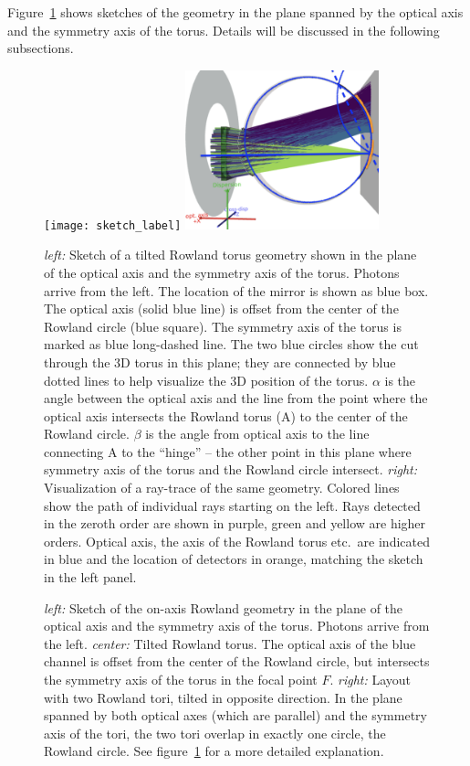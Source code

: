 \documentclass[linenumbers]{aastex631}
\begin{document}
Figure~\ref{fig:sketch_label} shows sketches of the geometry in the plane spanned by the optical axis and the symmetry axis of the torus. Details will be discussed in the following subsections.
\begin{figure}
    \texttt{[image: sketch\_label]}
    \includegraphics[width=0.5\textwidth]{raytrace_labelled}
    \caption{\emph{left:} Sketch of a tilted Rowland torus geometry shown in the plane of the optical axis and the symmetry axis of the torus. Photons arrive from the left. The location of the mirror is shown as blue box. The optical axis (solid blue line) is offset from the center of the Rowland circle (blue square). The symmetry axis of the torus  is marked as blue long-dashed line. The two blue circles show the cut through the 3D torus in this plane; they are connected by blue dotted lines to help visualize the 3D position of the torus. $\alpha$ is the angle between the optical axis and the line from the point where the optical axis intersects the Rowland torus (A) to the center of the Rowland circle. $\beta$ is the angle from optical axis to the line connecting A to the ``hinge'' -- the other point in this plane where symmetry axis of the torus and the Rowland circle intersect.
    \emph{right:} Visualization of a ray-trace of the same geometry. Colored lines show the path of individual rays starting on the left. Rays detected in the zeroth order are shown in purple, green and yellow are higher orders. Optical axis, the axis of the Rowland torus etc.\ are indicated in blue and the location of detectors in orange, matching the sketch in the left panel.
        }
    \label{fig:sketch_label}
\end{figure}
\begin{figure}
    \caption{\emph{left:} Sketch of the on-axis Rowland geometry in the plane of the optical axis and the symmetry axis of the torus. Photons arrive from the left.
    \emph{center:} Tilted Rowland torus. The optical axis of the blue channel is offset from the center of the Rowland circle, but intersects the symmetry axis of the torus in the focal point $F$.
    \emph{right:} Layout with two Rowland tori, tilted in opposite direction. In the plane spanned by both optical axes (which are parallel) and the symmetry axis of the tori, the two tori overlap in exactly one circle, the Rowland circle. See figure~\ref{fig:sketch_label} for a more detailed explanation.
        }
    \label{fig:sketch}
\end{figure}
\end{document}
